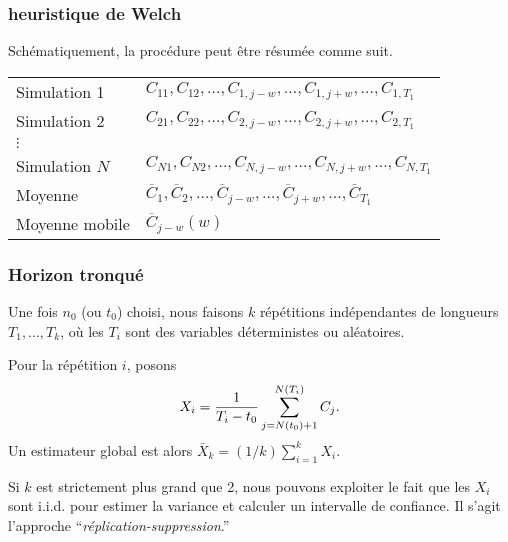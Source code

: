 \documentclass[t,usepdftitle=false]{beamer}
\def\iid{i.i.d.}
\begin{document}
\begin{frame}
\frametitle{heuristique de Welch}

Schématiquement, la procédure peut être résumée comme suit.

\mbox{}

\begin{center}
\begin{tabular}{l|l}
\hline
Simulation 1 &  $C_{11}, C_{12}, \ldots , C_{1,j-w}, \ldots, C_{1,j+w}, \ldots, C_{1,T_1}$ \\
Simulation 2 & $C_{21}, C_{22}, \ldots , C_{2,j-w}, \ldots, C_{2,j+w}, \ldots, C_{2,T_1}$ \\
$\vdots$ & \\
Simulation $N$ &
$C_{N1}, C_{N2}, \ldots , C_{N,j-w}, \ldots, C_{N,j+w}, \ldots, C_{N,T_1}$ \\
\hline
Moyenne & $\overline{C}_1, \overline{C}_2, \ldots , \overline{C}_{j-w}, \ldots, \overline{C}_{j+w}, \ldots, \overline{C}_{T_1}$ \\
Moyenne mobile & $\overline{C}_{j-w}(w)$ \\
\hline
\end{tabular}
\end{center}

\end{frame}

\begin{frame}
\frametitle{Horizon tronqué}

Une fois $n_0$ (ou $t_0$) choisi, nous faisons ${k}$ répétitions
indépendantes de longueurs $T_1,\dots,T_k$, où les ${T_i}$ sont
des variables déterministes ou aléatoires.

\mbox{}

Pour la répétition $i$, posons
$$
  {X_i} = {1\over T_i-t_0} \sum_{j=N(t_0)+1}^{N(T_i)} C_j.
$$
Un estimateur global est alors ${\bar X_k} = (1/k)\sum_{i=1}^k X_i$.

\mbox{}

Si $k$ est strictement plus grand que 2, nous pouvons exploiter le fait que les $X_i$ sont \iid{}
pour estimer la variance et calculer un intervalle de confiance.
Il s'agit l'approche ``\emph{réplication-suppression}.''

\end{frame}
\end{document}
